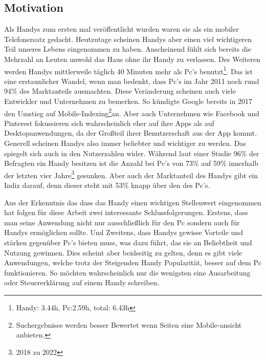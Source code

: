 \subsection{Motivation} \myCheckmark

Als Handys zum ersten mal veröffentlicht wurden waren sie als ein mobiler Telefonersatz gedacht. Heutzutage scheinen Handys aber einen viel wichtigeren Teil unseres Lebens eingenommen zu haben. Anscheinend fühlt sich bereits die Mehrzahl an Leuten unwohl das Haus ohne ihr Handy zu verlassen\cite{pcVsphone_feelingUneasyWhenLeavingPhoneHome}. Des Weiteren werden Handys mittlerweile täglich 40 Minuten mehr als Pc's benutzt\cite{pcVsphone_phoneScreenTime,pcVsphone_totalScreenTime,pcVsphone_totalScreenTime2}\footnote{Handy: 3.44h, Pc:2.59h, total: 6.43h}. Das ist eine erstaunlicher Wandel, wenn man bedenkt, dass Pc's im Jahr 2011 noch rund 94\% des Marktanteils ausmachten\cite{pcVsphone_smartphoneWebTrafficHigherThanPc}. Diese Veränderung scheinen auch viele Entwickler und Unternehmen zu bemerken. So kündigte Google bereits in 2017 den Umstieg auf Mobile-Indexing\footnote{Suchergebnisse werden besser Bewertet wenn Seiten eine Mobile-ansicht anbieten.}an\cite{pcVsphone_mobileFirstIndexing}. Aber auch Unternehmen wie Facebook und Pinterest fokussieren sich wahrscheinlich eher auf ihre Apps als auf Desktopanwendungen, da der Großteil ihrer Benutzerschaft aus der App kommt\cite{pcVsphone_socialMediaFacebookMobileUsage,pcVsphone_socialMediaPinterestMobileUsage}.\newline%
Generell scheinen Handys also immer beliebter und wichtiger zu werden. Das spiegelt sich auch in den Nutzerzahlen wider. Während laut einer Studie 96\% der Befragten ein Handy besitzen ist die Anzahl bei Pc's von 73\% auf 59\% innerhalb der letzten vier Jahre\footnote{2018 zu 2022} gesunken\cite{pcVsphone_deviceOwnership}. Aber auch der Marktanteil des Handys gibt ein Indiz darauf, denn dieser steht mit 53\% knapp über den des Pc's\cite{pcVsphone_smartphoneWebTrafficHigherThanPc}.%

\myNewSection%
Aus der Erkenntnis das dass das Handy einen wichtigen Stellenwert eingenommen hat folgen für diese Arbeit zwei interessante Schlussfolgerungen.\newline
Erstens, dass man seine Anwendung nicht nur ausschließlich für den Pc sondern auch für Handys ermöglichen sollte.\newline%
Und Zweitens, dass Handys gewisse Vorteile und stärken gegenüber Pc's bieten muss, was dazu führt, das sie an Beliebtheit und Nutzung gewinnen. Dies scheint aber beidseitig zu gelten, denn es gibt viele Anwendungen, welche trotz der Steigenden Handy Popularität, besser auf dem Pc funktionieren. So möchten wahrscheinlich nur die wenigsten eine Ausarbeitung oder Steuererklärung auf einem Handy schreiben.%


